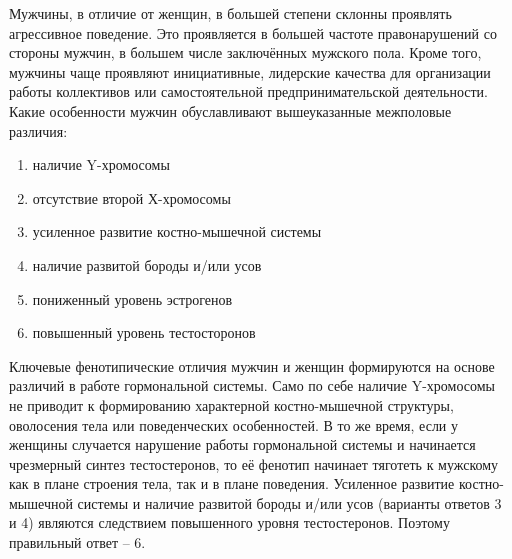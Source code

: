 
Мужчины, в отличие от женщин, в большей степени склонны проявлять агрессивное поведение. Это проявляется в большей частоте правонарушений со стороны мужчин, в большем числе заключённых мужского пола. Кроме того, мужчины чаще проявляют инициативные, лидерские качества для организации работы коллективов или самостоятельной предпринимательской деятельности. Какие особенности мужчин обуславливают вышеуказанные межполовые различия:

\begin{enumerate}
    \item наличие Y-хромосомы
    \item отсутствие второй Х-хромосомы
    \item усиленное развитие костно-мышечной системы
    \item наличие развитой бороды и/или усов
    \item пониженный уровень эстрогенов
    \item повышенный уровень тестосторонов
\end{enumerate}

\explanationSection

Ключевые фенотипические отличия мужчин и женщин формируются на основе различий в работе гормональной системы. Само по себе наличие Y-хромосомы не приводит к формированию характерной костно-мышечной структуры, оволосения тела или поведенческих особенностей. В то же время, если у женщины случается нарушение работы гормональной системы и начинается чрезмерный синтез тестостеронов, то её фенотип начинает тяготеть к мужскому как в плане строения тела, так и в плане поведения. Усиленное развитие костно-мышечной системы и наличие развитой бороды и/или усов (варианты ответов 3 и 4) являются следствием повышенного уровня тестостеронов. Поэтому правильный ответ – 6.


